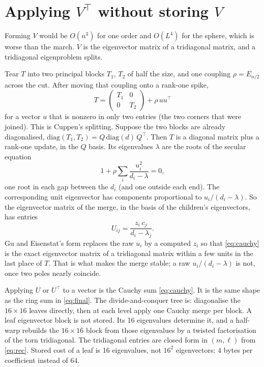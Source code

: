 \documentclass[11pt,a4paper]{article}
\numberwithin{equation}{section}
\begin{document}
\section{Applying \texorpdfstring{$V^\top$}{V transpose} without storing \texorpdfstring{$V$}{V}}
\label{sec:cuppen}

Forming $V$ would be $O(n^3)$ for one order and $O(L^4)$ for the sphere, which is worse
than the march. $V$ is the eigenvector matrix of a tridiagonal matrix, and a tridiagonal
eigenproblem splits.

Tear $T$ into two principal blocks $T_1$, $T_2$ of half the size, and one coupling
$\rho=E_{n/2}$ across the cut. After moving that coupling onto a rank-one spike,
\begin{equation}
  T = \begin{pmatrix} T_1 & 0 \\ 0 & T_2 \end{pmatrix} + \rho\, uu^\top
  \label{eq:cuppen}
\end{equation}
for a vector $u$ that is nonzero in only two entries (the two corners that were joined).
This is Cuppen's splitting. Suppose the two blocks are already diagonalised,
$\mathrm{diag}(T_1,T_2)=Q\,\mathrm{diag}(d)\,Q^\top$. Then $T$ is a diagonal matrix plus a
rank-one update, in the $Q$ basis. Its eigenvalues $\lambda$ are the roots of the secular
equation
\begin{equation}
  1 + \rho\sum_i \frac{u_i^2}{d_i-\lambda} = 0,
  \label{eq:secular}
\end{equation}
one root in each gap between the $d_i$ (and one outside each end).
The corresponding unit eigenvector has components proportional to $u_i/(d_i-\lambda)$.
So the eigenvector matrix of the merge, in the basis of the children's eigenvectors, has entries
\begin{equation}
  U_{ij} = \frac{z_i\, c_j}{d_i-\lambda_j}.
  \label{eq:cauchy}
\end{equation}
Gu and Eisenstat's form replaces the raw $u_i$ by a computed $z_i$ so that \eqref{eq:cauchy}
is the exact eigenvector matrix of a tridiagonal matrix within a few units in the last
place of $T$. That is what makes the merge stable; a raw $u_i/(d_i-\lambda)$ is not, once
two poles nearly coincide.

Applying $U$ or $U^\top$ to a vector is the Cauchy sum \eqref{eq:cauchy}. It is the same
shape as the ring sum in \eqref{eq:final}. The divide-and-conquer tree is: diagonalise
the $16\times 16$ leaves directly, then at each level apply one Cauchy merge per block.
A leaf eigenvector block is not stored. Its 16 eigenvalues determine it, and a half-warp
rebuilds the $16\times 16$ block from those eigenvalues by a twisted factorisation of the
torn tridiagonal. The tridiagonal entries are closed form in $(m,\ell)$ from
\eqref{eq:rec}. Stored cost of a leaf is 16 eigenvalues, not $16^2$ eigenvectors:
$4$ bytes per coefficient instead of $64$.
\end{document}
